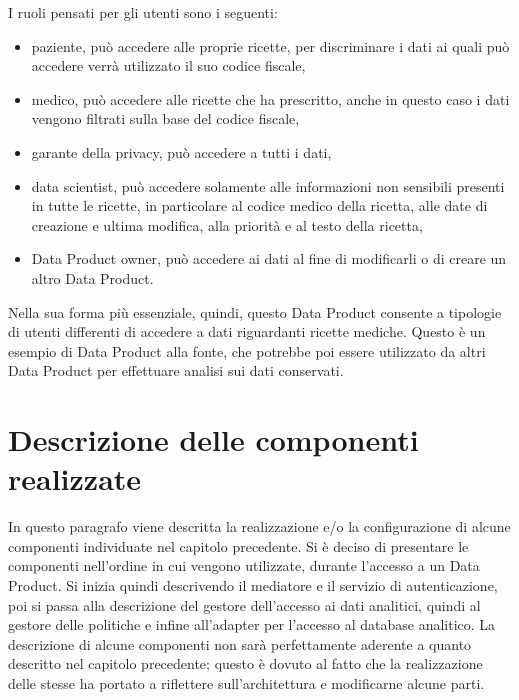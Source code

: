 \documentclass[12pt]{report}
\begin{document}
I ruoli pensati per gli utenti sono i seguenti:
\begin{itemize}
    \item paziente, può accedere alle proprie ricette, per discriminare i dati ai quali può accedere verrà utilizzato il suo codice fiscale,
    \item medico, può accedere alle ricette che ha prescritto, anche in questo caso i dati vengono filtrati sulla base del codice fiscale,
    \item garante della privacy, può accedere a tutti i dati,
    \item data scientist, può accedere solamente alle informazioni non sensibili presenti in tutte le ricette, in particolare al codice medico della ricetta, alle date  di creazione e ultima modifica, alla priorità e al testo della ricetta,  
    \item Data Product owner, può accedere ai dati al fine di modificarli o di creare un altro Data Product.
\end{itemize}
Nella sua forma più essenziale, quindi, questo Data Product consente a tipologie di utenti differenti di accedere a dati riguardanti ricette mediche.
Questo è un esempio di Data Product alla fonte, che potrebbe poi essere utilizzato da altri Data Product per effettuare analisi sui dati conservati.

\section{Descrizione delle componenti realizzate}
In questo paragrafo viene descritta la realizzazione e/o la configurazione di alcune componenti individuate nel capitolo precedente.
Si è deciso di presentare le componenti nell'ordine in cui vengono utilizzate, durante l'accesso a un Data Product.
Si inizia quindi descrivendo il mediatore e il servizio di autenticazione, poi si passa alla descrizione del gestore dell'accesso ai dati analitici, quindi al gestore delle politiche e infine all'adapter per l'accesso al database analitico.
La descrizione di alcune componenti non sarà perfettamente aderente a quanto descritto nel capitolo precedente; questo è dovuto al fatto che la realizzazione delle stesse ha portato a riflettere sull'architettura e modificarne alcune parti.
\end{document}
